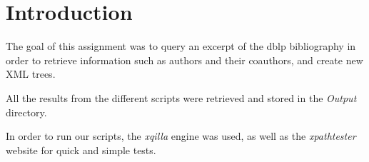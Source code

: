 \section{Introduction}

The goal of this assignment was to query an excerpt of the dblp bibliography
in order to retrieve information such as authors and their coauthors, and
create new XML trees.\\

\begin{framehint}
    All the results from the different scripts were retrieved and stored in the
    \emph{Output} directory.
\end{framehint}

\begin{framehint}
    In order to run our scripts, the \emph{xqilla} \cite{cite:xqilla} engine was
    used, as well as the \emph{xpathtester} \cite{cite:xpathtester} website for
    quick and simple tests.
\end{framehint}
